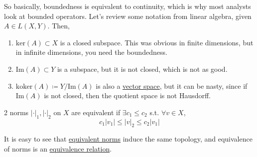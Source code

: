   So basically, boundedness is equivalent to continuity, which is why most analysts look at bounded operators. 
	Let's review some notation from linear algebra, given $A \in L(X, Y)$. Then, 
  \begin{enumerate}
    \item $\mathrm{ker}(A) \subset X$ is a closed subspace. This was obvious in finite dimensions, but in infinite dimensions, you need the boundedness. 
    \item $\mathrm{Im}(A) \subset Y$ is a subspace, but it is not closed, which is not as good. 
    \item $\mathrm{koker}(A) \coloneqq Y / \mathrm{Im}(A)$ is also a \hyperref[lin-def:vector-space]{vector space}, but it can be nasty, since if $\mathrm{Im}(A)$ is not closed, then the quotient space is not Hausdorff. 
  \end{enumerate} 

  \begin{definition}
    \label{def:equivalent-norms}
    2 norms $|\cdot|_1, |\cdot|_2$ on $X$ are equivalent if $\exists c_1 \leq c_2$ s.t. $\forall v \in X$, 
    \begin{equation}
      c_1 |v_1| \leq |v|_2 \leq c_2 |v_1|
    \end{equation}
  \end{definition}

  It is easy to see that \hyperref[def:equivalent-norms]{equivalent norms} induce the same topology, and equivalence of norms is an \hyperref[st-def:equivalence_relation]{equivalence relation}. 

